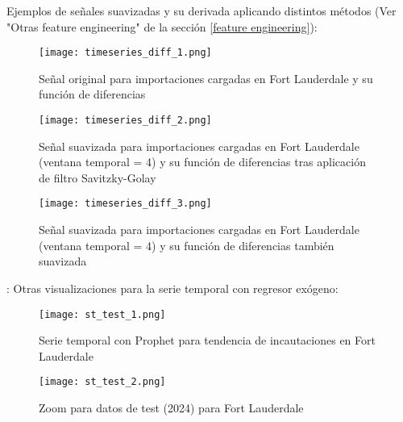 \documentclass[12pt]{article}
\begin{document}
\newpage
Ejemplos de señales suavizadas y su derivada aplicando distintos métodos (Ver "Otras feature engineering" de la sección \ref{feature engineering}):

\begin{figure}[H]
	\caption{\label{timeseries_diff_1} Señal original para importaciones cargadas en Fort Lauderdale y su función de diferencias}
	\centering
	\hspace*{1cm}
	\texttt{[image: timeseries\_diff\_1.png]}
\end{figure}

\begin{figure}[H]
	\caption{\label{timeseries_diff_2} Señal suavizada para importaciones cargadas en Fort Lauderdale (ventana temporal = 4) y su función de diferencias tras aplicación de filtro Savitzky-Golay}
	\centering
	\hspace*{1cm}
	\texttt{[image: timeseries\_diff\_2.png]}
\end{figure}

\begin{figure}[H]
	\caption{\label{timeseries_diff_3} Señal suavizada para importaciones cargadas en Fort Lauderdale (ventana temporal = 4) y su función de diferencias también suavizada}
	\centering
	\hspace*{1cm}
	\texttt{[image: timeseries\_diff\_3.png]}
\end{figure}

\newpage:
Otras visualizaciones para la serie temporal con regresor exógeno:
	
\begin{figure}[H]
	\caption{\label{st_test_1} Serie temporal con Prophet para tendencia de incautaciones en Fort Lauderdale}
	\centering
	\hspace*{1cm}
	\texttt{[image: st\_test\_1.png]}
\end{figure}

\begin{figure}[H]
	\caption{\label{st_test_2} Zoom para datos de test (2024) para Fort Lauderdale}
	\centering
	\hspace*{1cm}
	\texttt{[image: st\_test\_2.png]}
\end{figure}
\end{document}
